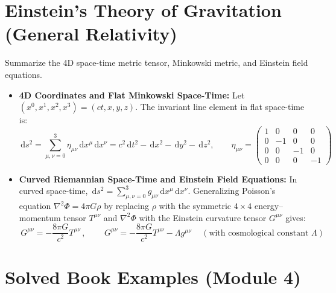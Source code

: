\documentclass[11pt,a4paper,openany,oneside]{book}
\newcommand{\eqbox}[1]{\boxed{\,#1\,}}
\newcommand{\dd}{\,\mathrm{d}}
\numberwithin{equation}{chapter}
\newcommand{\bk}[1]{\texorpdfstring{\enspace{\normalfont\small\color{slate}[Book #1]}}{ [Book #1]}}
\begin{document}
\section{Einstein's Theory of Gravitation (General Relativity)\bk{9.8}}

\begin{goal}
Summarize the 4D space-time metric tensor, Minkowski metric, and Einstein field equations.
\end{goal}

\begin{itemize}
  \item \textbf{4D Coordinates and Flat Minkowski Space-Time:} Let $(x^0, x^1, x^2, x^3) = (ct, x, y, z)$. The invariant line element in flat space-time is:
  \begin{equation}\label{eq:minkowski}
    \dd s^2 = \sum_{\mu,\nu=0}^3 \eta_{\mu\nu}\dd x^\mu\dd x^\nu = c^2\dd t^2 - \dd x^2 - \dd y^2 - \dd z^2, \qquad
    \eta_{\mu\nu} = \begin{pmatrix} 1 & 0 & 0 & 0 \\ 0 & -1 & 0 & 0 \\ 0 & 0 & -1 & 0 \\ 0 & 0 & 0 & -1 \end{pmatrix}
  \end{equation}
  \item \textbf{Curved Riemannian Space-Time and Einstein Field Equations:} In curved space-time, $\dd s^2 = \sum_{\mu,\nu=0}^3 g_{\mu\nu}\dd x^\mu\dd x^\nu$. Generalizing Poisson's equation $\nabla^2\Phi = 4\pi G\rho$ by replacing $\rho$ with the symmetric $4\times 4$ energy--momentum tensor $T^{\mu\nu}$ and $\nabla^2\Phi$ with the Einstein curvature tensor $G^{\mu\nu}$ gives:
  \begin{equation}\label{eq:einstein_eq}
    \eqbox{G^{\mu\nu} = -\frac{8\pi G}{c^2}T^{\mu\nu}}, \qquad \eqbox{G^{\mu\nu} = -\frac{8\pi G}{c^2}T^{\mu\nu} - \Lambda g^{\mu\nu}} \quad(\text{with cosmological constant }\Lambda)
  \end{equation}
\end{itemize}

\section{Solved Book Examples (Module 4)}
\end{document}
